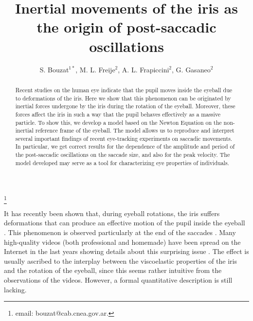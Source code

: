 \documentclass[prl]{revtex4}
\begin{document}
\title{Inertial movements of the iris as the origin of post-saccadic oscillations}

\author{S. Bouzat$^{1*}$, M. L. Freije$^2$, A. L. Frapiccini$^2$,  G. Gasaneo$^2$}

\thanks{email: bouzat@cab.cnea.gov.ar.}

\begin{abstract}
Recent studies on the human eye indicate that the pupil moves inside the eyeball due to deformations of the iris. Here we show that this phenomenon can be originated by inertial forces undergone by the iris during the rotation of the eyeball. Moreover, these forces affect the iris in such a way that the pupil behaves effectively as a massive particle. To show this, we develop a model based on the Newton Equation on the non-inertial reference frame of the eyeball. The model allows us to reproduce and interpret several important findings of recent eye-tracking experiments on saccadic movements. In particular, we get correct results for the dependence of the amplitude and period of the post-saccadic oscillations on the saccade size, and also for the peak velocity. The model developed may serve as a tool for characterizing eye properties of individuals.      
  
\end{abstract}

\maketitle

It has recently been shown that, during eyeball rotations, the iris suffers deformations that
can produce an effective motion of the pupil inside the eyeball \cite{holm2013,kim,holm,holm2016}.
This phenomenon is observed particularly at the end of the saccades \cite{sacdef,saccade}. Many high-quality videos (both professional and homemade) have been spread on the Internet in the last years showing details about this surprising issue \cite{videos}. The effect is usually ascribed to the interplay between the viscoelastic properties of the iris and the rotation of the eyeball, since this seems rather intuitive from the observations of the videos. However, a formal quantitative description is still lacking. 
\end{document}
